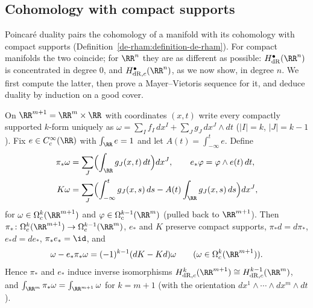 \subsection{Cohomology with compact supports}\label{de-rham:subsection-compact-supports}

Poincar\'e duality pairs the cohomology of a manifold with its cohomology with compact supports (Definition~\ref{de-rham:definition-de-rham}). For compact manifolds the two coincide; for $\RR^n$ they are as different
as possible: $H^\bullet_{\mathrm{dR}}(\RR^n)$ is concentrated in degree $0$, and $H^\bullet_{\mathrm{dR},c}(\RR^n)$, as we now show, in degree $n$. We first compute the latter, then prove a Mayer--Vietoris sequence for it,
and deduce duality by induction on a good cover.

\begin{lemma}\label{de-rham:lemma-integration-fibre}
On $\RR^{m+1} = \RR^m \times \RR$ with coordinates $(x, t)$ write every compactly supported $k$-form uniquely as $\omega = \sum_If_I\,dx^I + \sum_Jg_J\,dx^J \wedge dt$ ($|I| = k$, $|J| = k - 1$). Fix $e \in C^\infty_c(\RR)$ with
$\int_\RR e = 1$ and let $A(t) = \int_{-\infty}^te$. Define
\[
\begin{aligned}
\pi_*\omega &= \sum_J\Bigl(\int_\RR g_J(x, t)\,dt\Bigr)dx^J, \qquad e_*\varphi = \varphi \wedge e(t)\,dt, \\
K\omega &= \sum_J\Bigl(\int_{-\infty}^tg_J(x, s)\,ds - A(t)\int_\RR g_J(x, s)\,ds\Bigr)dx^J,
\end{aligned}
\]
for $\omega \in \Omega^k_c(\RR^{m+1})$ and $\varphi \in \Omega^{k-1}_c(\RR^m)$ (pulled back to $\RR^{m+1}$). Then $\pi_* \colon \Omega^k_c(\RR^{m+1}) \to \Omega^{k-1}_c(\RR^m)$, $e_*$ and $K$ preserve compact supports,
$\pi_*d = d\pi_*$, $e_*d = de_*$, $\pi_*e_* = \id$, and
\[
\omega - e_*\pi_*\omega = (-1)^{k-1}(dK - Kd)\omega \qquad (\omega \in \Omega^k_c(\RR^{m+1})).
\]
Hence $\pi_*$ and $e_*$ induce inverse isomorphisms $H^k_{\mathrm{dR},c}(\RR^{m+1}) \cong H^{k-1}_{\mathrm{dR},c}(\RR^m)$, and $\int_{\RR^m}\pi_*\omega = \int_{\RR^{m+1}}\omega$ for $k = m + 1$ (with the orientation $dx^1 \wedge \cdots \wedge dx^m \wedge dt$).
\end{lemma}


